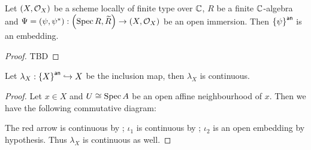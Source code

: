 
\begin{lemma}\label{thm:open-immersion-induced-embedding-complex-topology}
  Let $\left(X, \mathcal{O}_{X}\right)$ be a scheme locally of finite type over $\mathbb{C}$, $R$ be a finite $\mathbb{C}$-algebra and $\Psi = (\psi, \psi^{*}) : \left(\operatorname*{Spec}{R}, \widetilde{R}\right) \to \left(X, \mathcal{O}_{X}\right)$ be an open immersion. Then ${\left\{{\psi}\right\}}^{\mathsf{an}}$ is an embedding.
\end{lemma}

\begin{proof}
  TBD
\end{proof}

\begin{lemma}\label{thm:continuous-inclusion-complex-topology}
  Let $\lambda_{X} : {\left\{{X}\right\}}^{\mathsf{an}} \hookrightarrow X$ be the inclusion map, then $\lambda_{X}$ is continuous.
\end{lemma}
\begin{proof}
  Let $x \in X$ and $U \cong \operatorname{Spec} A$ be an open affine neighbourhood of $x$. Then we have the following commutative diagram:
  \begin{center}
  \end{center}
  The red arrow is continuous by ; $\iota_{1}$ is continuous by ; $\iota_{2}$ is an open embedding by hypothesis. Thus $\lambda_{X}$ is continuous as well.
\end{proof}

